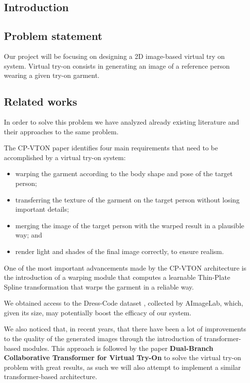 \begin{multicols}{2}
\tableofcontents
\section{Introduction}

\subsection{Problem statement}

Our project will be focusing on designing a 2D image-based virtual try on system. Virtual try-on consists in generating an image of a reference person wearing a given try-on garment. 

\subsection{Related works}
In order to solve this problem we have analyzed already existing literature and their approaches to the same problem.

The CP-VTON paper\cite{CP-VTON} identifies four main requirements that need to be accomplished by a virtual try-on system:
\begin{itemize}
\item warping the garment according to the body shape and pose of the target person; 
\item transferring the texture of the garment on the target person without losing important details; 
\item merging the image of the target person with the warped result in a plausible way; and 
\item render light and shades of the final image correctly, to ensure realism.
\end{itemize}


One of the most important advancements made by the CP-VTON architecture is the introduction of a warping module that computes a learnable Thin-Plate Spline transformation that warps the garment in a reliable way.

We obtained access to the Dress-Code dataset \cite{dress-code}, collected by AImageLab, which, given its size, may potentially boost the efficacy of our system.

We also noticed that, in recent years, that there have been a lot of improvements to the quality of the generated images through the introduction of transformer-based modules. 
This approach is followed by the paper \textbf{Dual-Branch Collaborative Transformer for Virtual Try-On}\cite{dual-branch} to solve the virtual try-on problem with great results, as such we will also attempt to implement a similar transformer-based architecture. 


\end{multicols}
